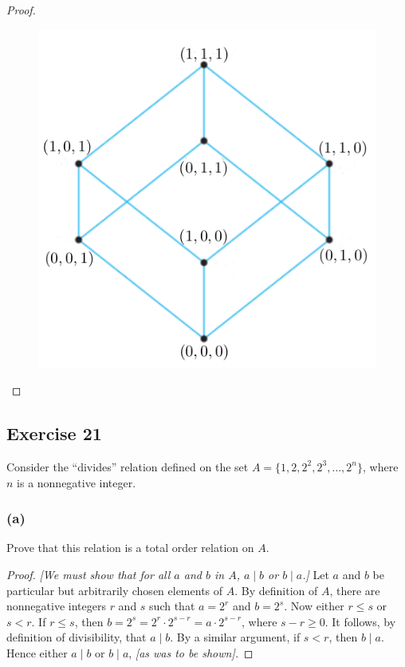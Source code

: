 \documentclass[14pt]{extarticle}
\begin{document}
\begin{proof}
        \begin{figure}[ht!]
                \centering
                \includegraphics[scale=0.4]{../images/8.5.20.png}
        \end{figure}
\end{proof}

\subsection{Exercise 21}
Consider the “divides” relation defined on the set \(A = \{1, 2, 2^2, 2^3, \ldots, 2^n\}\), where $n$ is a
nonnegative integer.

\subsubsection{(a)}
Prove that this relation is a total order relation on $A$.

\begin{proof}
        {\it [We must show that for all $a$ and $b$ in $A$, \(a \mid b\) or \(b \mid a\).]} Let $a$ and $b$ be particular
        but arbitrarily chosen elements of $A$. By definition of $A$, there are nonnegative integers $r$ and $s$ such that
        \(a = 2^r\) and \(b = 2^s\). Now either \(r \leq s\) or \(s < r\). If \(r \leq s\), then \(b = 2^s = 2^r \cdot 2^{s-r}
        = a \cdot 2^{s-r}\), where \(s - r \geq 0\). It follows, by definition of divisibility, that \(a \mid b\). By a similar
        argument, if \(s < r\), then \(b \mid a\). Hence either \(a \mid b\) or \(b \mid a\), {\it [as was to be shown].}
\end{proof}
\end{document}
